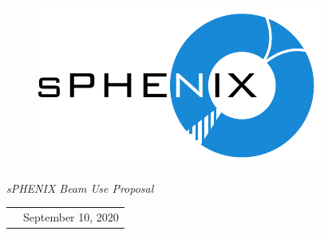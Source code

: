 \renewcommand*\familydefault{\sfdefault}
{\sffamily
\vfill
\vspace{4cm}
\begin{figure}[H]
  \begin{center}
  \includegraphics[width=0.6\linewidth]{figs/sPHENIX}
  \end{center}
\end{figure}

\vfill

\begin{center}
  \large
  \emph{\Large{sPHENIX Beam Use Proposal}}

  \begin{tabular}{rl}
  &September 10, 2020 \\
  \end{tabular}
\end{center}

\vspace{2cm}

}


\vfill
\renewcommand*\familydefault{\rmdefault}

